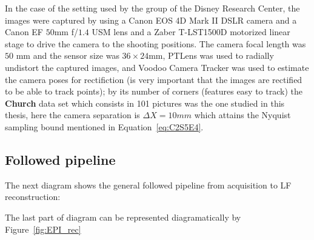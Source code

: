 \bigskip

In the case of the setting used by the group of the Disney Research Center, the images were captured by using a Canon EOS 4D Mark II DSLR camera and a Canon EF $50$mm f/$1.4$ USM lens and a Zaber T-LST1500D motorized linear stage to drive the camera to the shooting positions. The camera focal length was $50$ mm and the sensor size was $36\times24$mm, PTLens was used to radially undistort the captured images, and Voodoo Camera Tracker was used to estimate the camera poses for rectifiction (is very important that the images are rectified to be able to track points); by its number of corners (features easy to track) the \textbf{Church} data set which consists in 101 pictures was the one studied in this thesis, here the camera separation is $\Delta X=10mm$ which attains the Nyquist sampling bound mentioned in Equation~\ref{eq:C2S5E4}.

\subsection{Followed pipeline}

The next diagram shows the general followed pipeline from acquisition to LF reconstruction:

\begin{center}
\end{center}

The last part of diagram can be represented diagramatically by Figure~\ref{fig:EPI_rec}


